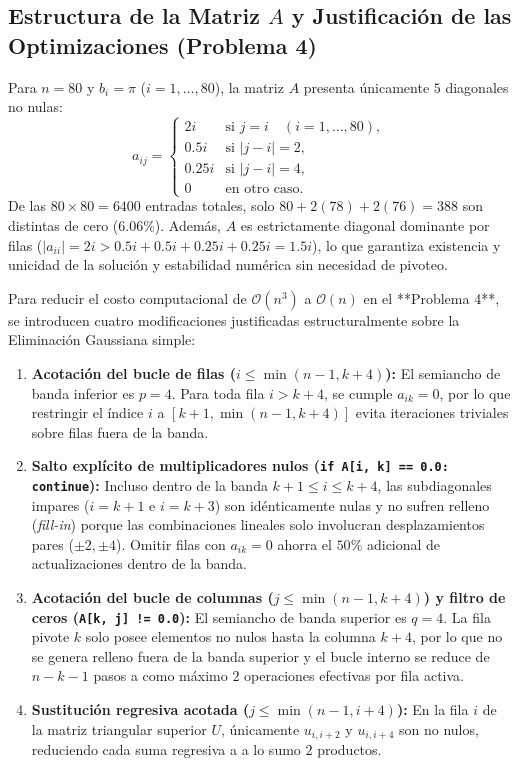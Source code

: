 \documentclass[11pt,letterpaper]{article}
\begin{document}
\subsection{Estructura de la Matriz $A$ y Justificación de las Optimizaciones (Problema 4)}
Para $n = 80$ y $b_i = \pi$ ($i = 1, \dots, 80$), la matriz $A$ presenta únicamente $5$ diagonales no nulas:
\begin{equation}
    a_{ij} = \begin{cases}
        2i & \text{si } j = i \quad (i = 1, \dots, 80), \\
        0.5i & \text{si } |j - i| = 2, \\
        0.25i & \text{si } |j - i| = 4, \\
        0 & \text{en otro caso.}
    \end{cases}
\end{equation}
De las $80 \times 80 = 6400$ entradas totales, solo $80 + 2(78) + 2(76) = 388$ son distintas de cero ($6.06\%$). Además, $A$ es estrictamente diagonal dominante por filas ($|a_{ii}| = 2i > 0.5i + 0.5i + 0.25i + 0.25i = 1.5i$), lo que garantiza existencia y unicidad de la solución y estabilidad numérica sin necesidad de pivoteo.

Para reducir el costo computacional de $\mathcal{O}(n^3)$ a $\mathcal{O}(n)$ en el **Problema 4**, se introducen cuatro modificaciones justificadas estructuralmente sobre la Eliminación Gaussiana simple:
\begin{enumerate}
    \item \textbf{Acotación del bucle de filas ($i \le \min(n-1, k+4)$):} El semiancho de banda inferior es $p = 4$. Para toda fila $i > k + 4$, se cumple $a_{ik} = 0$, por lo que restringir el índice $i$ a $[k+1, \min(n-1, k+4)]$ evita iteraciones triviales sobre filas fuera de la banda.
    \item \textbf{Salto explícito de multiplicadores nulos (\texttt{if A[i, k] == 0.0: continue}):} Incluso dentro de la banda $k+1 \le i \le k+4$, las subdiagonales impares ($i = k+1$ e $i = k+3$) son idénticamente nulas y no sufren relleno (\textit{fill-in}) porque las combinaciones lineales solo involucran desplazamientos pares ($\pm 2, \pm 4$). Omitir filas con $a_{ik} = 0$ ahorra el $50\%$ adicional de actualizaciones dentro de la banda.
    \item \textbf{Acotación del bucle de columnas ($j \le \min(n-1, k+4)$) y filtro de ceros (\texttt{A[k, j] != 0.0}):} El semiancho de banda superior es $q = 4$. La fila pivote $k$ solo posee elementos no nulos hasta la columna $k + 4$, por lo que no se genera relleno fuera de la banda superior y el bucle interno se reduce de $n - k - 1$ pasos a como máximo $2$ operaciones efectivas por fila activa.
    \item \textbf{Sustitución regresiva acotada ($j \le \min(n-1, i+4)$):} En la fila $i$ de la matriz triangular superior $U$, únicamente $u_{i,i+2}$ y $u_{i,i+4}$ son no nulos, reduciendo cada suma regresiva a a lo sumo $2$ productos.
\end{enumerate}
\end{document}
